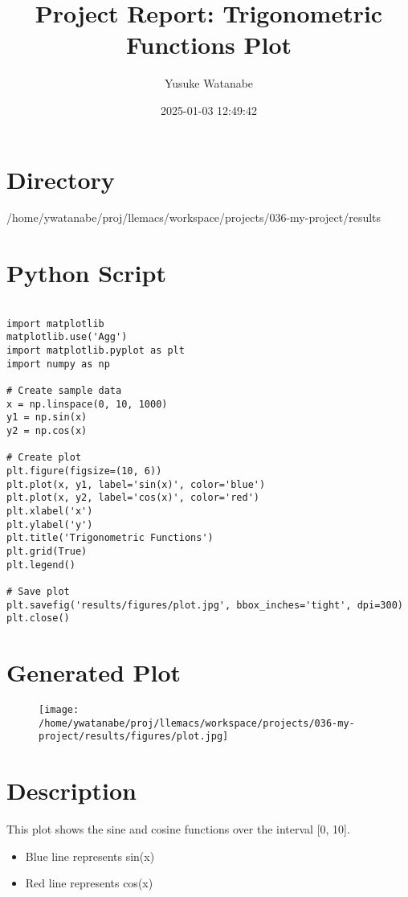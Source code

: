 \documentclass[11pt]{article}
\author{Yusuke Watanabe}
\date{2025-01-03 12:49:42}
\title{Project Report: Trigonometric Functions Plot}
\begin{document}
\maketitle
\tableofcontents


\section{Directory}
\label{sec:org8a71917}
/home/ywatanabe/proj/llemacs/workspace/projects/036-my-project/results

\section{Python Script}
\label{sec:orgd53ae16}
\begin{verbatim}

import matplotlib
matplotlib.use('Agg')
import matplotlib.pyplot as plt
import numpy as np

# Create sample data
x = np.linspace(0, 10, 1000)
y1 = np.sin(x)
y2 = np.cos(x)

# Create plot
plt.figure(figsize=(10, 6))
plt.plot(x, y1, label='sin(x)', color='blue')
plt.plot(x, y2, label='cos(x)', color='red')
plt.xlabel('x')
plt.ylabel('y')
plt.title('Trigonometric Functions')
plt.grid(True)
plt.legend()

# Save plot
plt.savefig('results/figures/plot.jpg', bbox_inches='tight', dpi=300)
plt.close()
\end{verbatim}

\section{Generated Plot}
\label{sec:orge88dcc2}
\begin{figure}[H]
\centering
\texttt{[image: /home/ywatanabe/proj/llemacs/workspace/projects/036-my-project/results/figures/plot.jpg]}
\end{figure}

\section{Description}
\label{sec:org7195282}
This plot shows the sine and cosine functions over the interval [0, 10].
\begin{itemize}
\item Blue line represents sin(x)
\item Red line represents cos(x)
\end{itemize}
\end{document}
